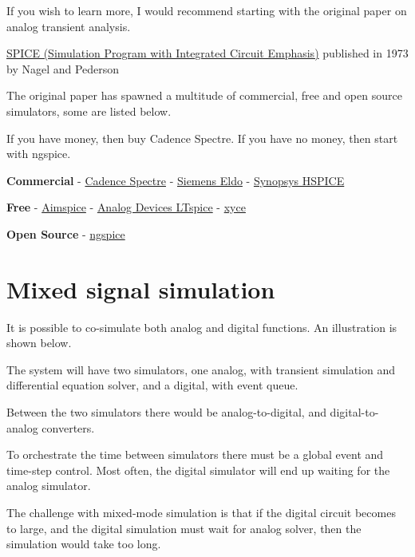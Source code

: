 If you wish to learn more, I would recommend starting with the original
paper on analog transient analysis.

\href{https://www2.eecs.berkeley.edu/Pubs/TechRpts/1973/ERL-m-382.pdf}{SPICE
(Simulation Program with Integrated Circuit Emphasis)} published in 1973
by Nagel and Pederson

The original paper has spawned a multitude of commercial, free and open
source simulators, some are listed below.

If you have money, then buy Cadence Spectre. If you have no money, then
start with ngspice.

\textbf{Commercial} -
\href{https://www.cadence.com/ko_KR/home/tools/custom-ic-analog-rf-design/circuit-simulation/spectre-simulation-platform.html}{Cadence
Spectre} - \href{https://eda.sw.siemens.com/en-US/ic/eldo/}{Siemens
Eldo} -
\href{https://www.synopsys.com/implementation-and-signoff/ams-simulation/primesim-hspice.html}{Synopsys
HSPICE}

\textbf{Free} - \href{http://aimspice.com}{Aimspice} -
\href{https://www.analog.com/en/design-center/design-tools-and-calculators/ltspice-simulator.html}{Analog
Devices LTspice} - \href{https://xyce.sandia.gov}{xyce}

\textbf{Open Source} - \href{http://ngspice.sourceforge.net}{ngspice}

\section{Mixed signal simulation}\label{mixed-signal-simulation}

It is possible to co-simulate both analog and digital functions. An
illustration is shown below.

The system will have two simulators, one analog, with transient
simulation and differential equation solver, and a digital, with event
queue.

Between the two simulators there would be analog-to-digital, and
digital-to-analog converters.

To orchestrate the time between simulators there must be a global event
and time-step control. Most often, the digital simulator will end up
waiting for the analog simulator.

The challenge with mixed-mode simulation is that if the digital circuit
becomes to large, and the digital simulation must wait for analog
solver, then the simulation would take too long.

